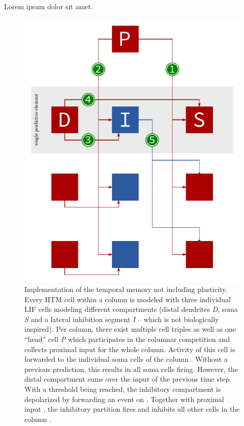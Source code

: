 Lorem ipsum dolor sit amet.

\begin{figure}
	\begin{center}
		\includegraphics{../circuitry/column.pdf}
	\end{center}
	\caption{Implementation of the temporal memory not including plasticity. Every HTM cell within a column is modeled with three individual LIF cells modeling different compartments (distal dendrites \emph{D}, soma \emph{S} and a lateral inhibition segment \emph{I} -- which is not biologically inspired). Per column, there exist multiple cell triples as well as one ``head'' cell \emph{P} which participates in the columnar competition and collects proximal input for the whole column. Activity of this cell is forwarded to the individual soma cells of the column \protect{}. Without a previous prediction, this results in all soma cells firing. However, the distal compartment sums over the input of the previous time step. With a threshold being reached, the inhibitory compartment is depolarized by forwarding an event on \protect{}. Together with proximal input \protect{}, the inhibitory partition fires and inhibits all other cells in the column \protect{}.}
	\label{fig:static_temporal_memory}
\end{figure}

